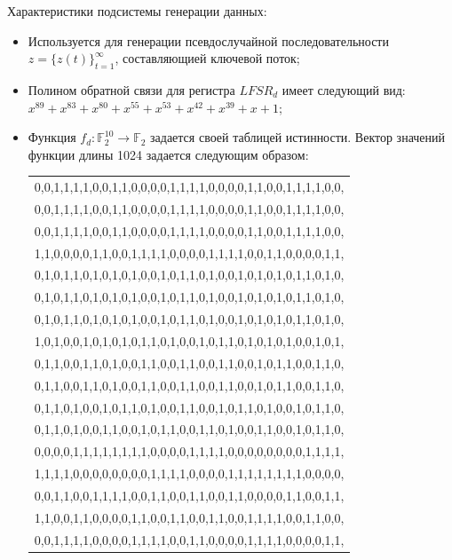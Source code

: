 \documentclass{./civarticle}
\begin{document}
Характеристики подсистемы генерации данных:
\begin{itemize}
    \item Используется для генерации псевдослучайной последовательности $z = \{z(t)\}_{t = 1}^{\infty}$, составляющией ключевой поток;
    \item Полином обратной связи для регистра $LFSR_d$ имеет следующий вид: $x^{89} + x^{83} + x^{80} + x^{55} + x^{53} + x^{42} + x^{39} + x + 1$;
    \item Функция $f_d: \mathbb{F}^{10}_2 \rightarrow \mathbb{F}_2$ задается своей таблицей истинности. Вектор значений функции длины 1024 задается следующим образом:

\begin{longtable}{|p{7.5cm}|}
\hline
0,0,1,1,1,1,0,0,1,1,0,0,0,0,1,1,1,1,0,0,0,0,1,1,0,0,1,1,1,1,0,0, \\
0,0,1,1,1,1,0,0,1,1,0,0,0,0,1,1,1,1,0,0,0,0,1,1,0,0,1,1,1,1,0,0, \\
0,0,1,1,1,1,0,0,1,1,0,0,0,0,1,1,1,1,0,0,0,0,1,1,0,0,1,1,1,1,0,0, \\
1,1,0,0,0,0,1,1,0,0,1,1,1,1,0,0,0,0,1,1,1,1,0,0,1,1,0,0,0,0,1,1, \\
0,1,0,1,1,0,1,0,1,0,1,0,0,1,0,1,1,0,1,0,0,1,0,1,0,1,0,1,1,0,1,0, \\
0,1,0,1,1,0,1,0,1,0,1,0,0,1,0,1,1,0,1,0,0,1,0,1,0,1,0,1,1,0,1,0, \\
0,1,0,1,1,0,1,0,1,0,1,0,0,1,0,1,1,0,1,0,0,1,0,1,0,1,0,1,1,0,1,0, \\
1,0,1,0,0,1,0,1,0,1,0,1,1,0,1,0,0,1,0,1,1,0,1,0,1,0,1,0,0,1,0,1, \\
0,1,1,0,0,1,1,0,1,0,0,1,1,0,0,1,1,0,0,1,1,0,0,1,0,1,1,0,0,1,1,0, \\
0,1,1,0,0,1,1,0,1,0,0,1,1,0,0,1,1,0,0,1,1,0,0,1,0,1,1,0,0,1,1,0, \\
0,1,1,0,1,0,0,1,0,1,1,0,1,0,0,1,1,0,0,1,0,1,1,0,1,0,0,1,0,1,1,0, \\
0,1,1,0,1,0,0,1,1,0,0,1,0,1,1,0,0,1,1,0,1,0,0,1,1,0,0,1,0,1,1,0, \\
0,0,0,0,1,1,1,1,1,1,1,1,0,0,0,0,1,1,1,1,0,0,0,0,0,0,0,0,1,1,1,1, \\
1,1,1,1,0,0,0,0,0,0,0,0,1,1,1,1,0,0,0,0,1,1,1,1,1,1,1,1,0,0,0,0, \\
0,0,1,1,0,0,1,1,1,1,0,0,1,1,0,0,1,1,0,0,1,1,0,0,0,0,1,1,0,0,1,1, \\
1,1,0,0,1,1,0,0,0,0,1,1,0,0,1,1,0,0,1,1,0,0,1,1,1,1,0,0,1,1,0,0, \\
0,0,1,1,1,1,0,0,0,0,1,1,1,1,0,0,1,1,0,0,0,0,1,1,1,1,0,0,0,0,1,1, \\

\end{longtable}
\end{itemize}
\end{document}

